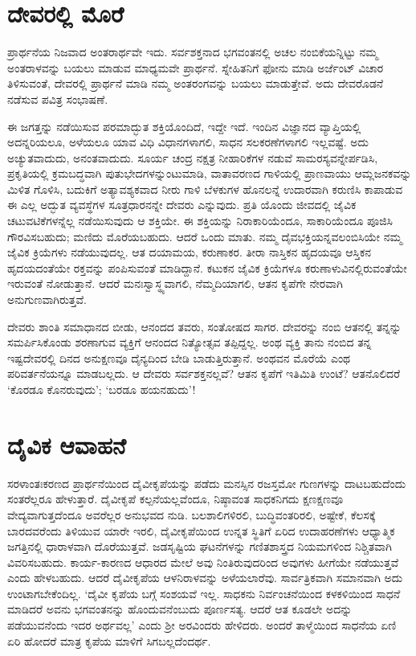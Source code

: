 \section{ದೇವರಲ್ಲಿ ಮೊರೆ}

ಪ್ರಾರ್ಥನೆಯ ನಿಜವಾದ ಅಂತರಾರ್ಥವೇ ಇದು. ಸರ್ವಶಕ್ತನಾದ ಭಗವಂತನಲ್ಲಿ ಅಚಲ ನಂಬಿಕೆಯನ್ನಿಟ್ಟು ನಮ್ಮ ಅಂತರಾಳವನ್ನು ಬಯಲು ಮಾಡುವ ಮಾಧ್ಯಮವೇ ಪ್ರಾರ್ಥನೆ. ಸ್ನೇಹಿತನಿಗೆ ಫೋನು ಮಾಡಿ ಅರ್ಜೆಂಟ್ ವಿಚಾರ ತಿಳಿಸುವಂತೆ, ದೇವರಲ್ಲಿ ಪ್ರಾರ್ಥನೆ ಮಾಡಿ ನಮ್ಮ ಅಂತರಂಗವನ್ನು ಬಯಲು ಮಾಡುತ್ತೇವೆ. ಅದು ದೇವರೊಡನೆ ನಡೆಸುವ ಪವಿತ್ರ ಸಂಭಾಷಣೆ.

ಈ ಜಗತ್ತನ್ನು ನಡೆಯಿಸುವ ಪರಮಾದ್ಭುತ ಶಕ್ತಿಯೊಂದಿದೆ, ಇದ್ದೇ ಇದೆ. ಇಂದಿನ ವಿಜ್ಞಾನದ ವ್ಯಾಪ್ತಿಯಲ್ಲಿ ಅದನ್ನರಿಯಲೂ, ಅಳೆಯಲೂ ಯಾವ ವಿಧಿ ವಿಧಾನಗಳಾಗಲಿ, ಸಾಧನ ಸಲಕರಣೆಗಳಾಗಲಿ ಇಲ್ಲವಷ್ಟೆ. ಅದು ಅಚ್ಯುತವಾದುದು, ಅನಂತವಾದುದು. ಸೂರ್ಯ ಚಂದ್ರ ನಕ್ಷತ್ರ ನೀಹಾರಿಕೆಗಳ ನಡುವೆ ಸಾಮರಸ್ಯವನ್ನೇರ್ಪಡಿಸಿ, ಪ್ರಕೃತಿಯಲ್ಲಿ ಕ್ರಮಬದ್ಧವಾಗಿ ಪುತುಭೇದಗಳನ್ನುಂಟುಮಾಡಿ, ವಾತಾವರಣದ ಗಾಳಿಯಲ್ಲಿ ಪ್ರಾಣವಾಯು ಆಮ್ಲಜನಕವನ್ನು ಮಿಳಿತ ಗೊಳಿಸಿ, ಬದುಕಿಗೆ ಅತ್ಯಾವಶ್ಯಕವಾದ ನೀರು ಗಾಳಿ ಬೆಳಕುಗಳ ಹೊನಲನ್ನೆ ಉದಾರವಾಗಿ ಕರುಣಿಸಿ ಕಾಪಾಡುವ ಈ ಎಲ್ಲ ಅದ್ಭುತ ವ್ಯವಸ್ಥೆಗಳ ಸೂತ್ರಧಾರನನ್ನೇ ದೇವರು ಎನ್ನುವುದು. ಪ್ರತಿ ಯೊಂದು ಜೀವದಲ್ಲಿ ಜೈವಿಕ ಚಟುವಟಿಕೆಗಳನ್ನೆಲ್ಲ ನಡೆಯಿಸುವುದು ಆ ಶಕ್ತಿಯೇ. ಈ ಶಕ್ತಿಯನ್ನು ನಿರಾಕಾರಿಯೆಂದೂ, ಸಾಕಾರಿಯೆಂದೂ ಪೂಜಿಸಿ ಗೌರವಿಸಬಹುದು; ಮಣಿದು ಮೊರೆಯಬಹುದು. ಆದರೆ ಒಂದು ಮಾತು. ನಮ್ಮ ದೈವಭಕ್ತಿಯನ್ನವಲಂಬಿಸಿಯೇ ನಮ್ಮ ಜೈವಿಕ ಕ್ರಿಯೆಗಳು ನಡೆಯುವುದಲ್ಲ. ಆತ ದಯಾಮಯ, ಕರುಣಾಕರ. ತೀರಾ ನಾಸ್ತಿಕನ ಹೃದಯವೂ ಆಸ್ತಿಕನ ಹೃದಯದಂತೆಯೇ ರಕ್ತವನ್ನು ಪಂಪಿಸುವಂತೆ ಮಾಡಿದ್ದಾನೆ. ಕಟುಕನ ಜೈವಿಕ ಕ್ರಿಯೆಗಳೂ ಕರುಣಾಳುವಿನಲ್ಲಿರುವಂತೆಯೇ ಇರುವಂತೆ ನೋಡುತ್ತಾನೆ. ಆದರೆ ಮನಃಸ್ವಾಸ್ಥ್ಯವಾಗಲಿ, ನೆಮ್ಮದಿಯಾಗಲಿ, ಆತನ ಕೃಪೆಗೇ ನೇರವಾಗಿ ಅನುಗುಣವಾಗಿರುತ್ತವೆ.

ದೇವರು ಶಾಂತಿ ಸಮಾಧಾನದ ಬೀಡು, ಆನಂದದ ತವರು, ಸಂತೋಷದ ಸಾಗರ. ದೇವರನ್ನು ನಂಬಿ ಆತನಲ್ಲಿ ತನ್ನನ್ನು ಸಮರ್ಪಿಸಿಕೊಂಡು ಶರಣಾಗುವ ವ್ಯಕ್ತಿಗೆ ಆನಂದದ ನಿತ್ಯೋತ್ಸವ ತಪ್ಪಿದ್ದಲ್ಲ. ಅಂಥ ವ್ಯಕ್ತಿ ತಾನು ನಂಬಿದ ತನ್ನ ಇಷ್ಟದೇವರಲ್ಲಿ ದಿನದ ಅನುಕ್ಷಣವೂ ದೈನ್ಯದಿಂದ ಬೇಡಿ ಬಾಡುತ್ತಿರುತ್ತಾನೆ. ಅಂಥವನ ಮೊರೆಯೆ ಎಂಥ ಪರಿವರ್ತನೆಯನ್ನೂ ಮಾಡಬಲ್ಲದು. ಆ ದೇವರು ಸರ್ವಶಕ್ತನಲ್ಲವೆ? ಆತನ ಕೃಪೆಗೆ ಇತಿಮಿತಿ ಉಂಟೆ? ಆತನೊಲಿದರೆ ‘ಕೊರಡೂ ಕೊನರುವುದು’; ‘ಬರಡೂ ಹಯನಹುದು’!


\section{ದೈವಿಕ ಆವಾಹನೆ}

ಸರಳಾಂತಃಕರಣದ ಪ್ರಾರ್ಥನೆಯಿಂದ ದೈವೀಕೃಪೆಯನ್ನು ಪಡೆದು ಮನಸ್ಸಿನ ರಜಸ್ತಮೋ ಗುಣಗಳನ್ನು ದಾಟಬಹುದೆಂದು ಸಂತರೆಲ್ಲರೂ ಹೇಳುತ್ತಾರೆ. ದೈವೀಕೃಪೆ ಕಲ್ಪನೆಯಲ್ಲವೆಂದೂ, ನಿಷ್ಠಾವಂತ ಸಾಧಕನಿಗದು ಕ್ಷಣಕ್ಷಣವೂ ವೇದ್ಯವಾಗುತ್ತದೆಂದೂ ಅವರೆಲ್ಲರ ಅನುಭವದ ನುಡಿ. ಬಲಶಾಲಿಗಳಿರಲಿ, ಬುದ್ಧಿವಂತರಿರಲಿ, ಅಷ್ಟೇಕೆ, ಕೆಲಸಕ್ಕೆ ಬಾರದವರೆಂದು ತಿಳಿಯುವ ಯಾರೇ ಇರಲಿ, ದೈವೀಕೃಪೆಯಿಂದ ಉನ್ನತ ಸ್ಥಿತಿಗೆ ಏರಿದ ಉದಾಹರಣೆಗಳು ಆಧ್ಯಾತ್ಮಿಕ ಜಗತ್ತಿನಲ್ಲಿ ಧಾರಾಳವಾಗಿ ದೊರೆಯುತ್ತವೆ. ಜಡಸೃಷ್ಟಿಯ ಘಟನೆಗಳನ್ನು ಗಣಿತಶಾಸ್ತ್ರದ ನಿಯಮಗಳಿಂದ ನಿಶ್ಚಿತವಾಗಿ ವಿವರಿಸಬಹುದು. ಕಾರ್ಯ-ಕಾರಣದ ಆಧಾರದ ಮೇಲೆ ಅವು ನಿಂತಿರುವುದರಿಂದ ಅವುಗಳು ಹೀಗೆಯೇ ನಡೆಯುತ್ತವೆ ಎಂದು ಹೇಳಬಹುದು. ಆದರೆ ದೈವೀಕೃಪೆಯ ಆಳನಿರಾಳವನ್ನು ಅಳೆಯಲಾರೆವು. ಸಾರ್ವತ್ರಿಕವಾಗಿ ಸಮಾನವಾಗಿ ಅದು ಉಂಟಾಗಬೇಕೆಂದಿಲ್ಲ. ‘ದೈವೀ ಕೃಪೆಯ ಬಗ್ಗೆ ಸಂಶಯವೆ ಇಲ್ಲ. ಸಾಧಕನು ನಿರ್ವಂಚನೆಯಿಂದ ಕಳಕಳಿಯಿಂದ ಸಾಧನೆ ಮಾಡಿದರೆ ಅವನು ಭಗವಂತನನ್ನು ಹೊಂದುವನೆಂಬುದು ಪೂರ್ಣಸತ್ಯ. ಆದರೆ ಆತ ಕೂಡಲೇ ಅದನ್ನು ಪಡೆಯುವನೆಂದು ಇದರ ಅರ್ಥವಲ್ಲ’ ಎಂದು ಶ‍್ರೀ ಅರವಿಂದರು ಹೇಳಿದರು. ಅಂದರೆ ತಾಳ್ಮೆಯಿಂದ ಸಾಧನೆಯ ಏಣಿ ಏರಿ ಹೋದರೆ ಮಾತ್ರ ಕೃಪೆಯ ಮಾಳಿಗೆ ಸಿಗಬಲ್ಲದೆಂದರ್ಥ.

